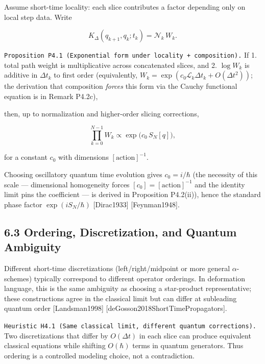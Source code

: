 \documentclass[
]{article}
\begin{document}
Assume short-time locality: each slice contributes a factor depending
only on local step data. Write

\[
K_\Delta(q_{k+1},q_k;t_k)=\mathcal N_k\,W_k.
\]

\texttt{Proposition\ P4.1\ (Exponential\ form\ under\ locality\ +\ composition).}
If 1. total path weight is multiplicative across concatenated slices,
and 2. \(\log W_k\) is additive in \(\Delta t_k\) to first order
(equivalently,
\(W_k = \exp(c_0 \mathcal{L}_k \Delta t_k + O(\Delta t^2))\); the
derivation that composition \emph{forces} this form via the Cauchy
functional equation is in Remark P4.2c),

then, up to normalization and higher-order slicing corrections,

\[
\prod_{k=0}^{N-1}W_k
\propto
\exp\!\big(c_0\,S_N[q]\big),
\]

for a constant \(c_0\) with dimensions \([\text{action}]^{-1}\).

Choosing oscillatory quantum time evolution gives \(c_0=i/\hbar\) (the
necessity of this scale --- dimensional homogeneity forces
\([c_0]=[\text{action}]^{-1}\) and the identity limit pins the
coefficient --- is derived in Proposition P4.2(ii)), hence the standard
phase factor \(\exp(iS_N/\hbar)\) {[}Dirac1933{]} {[}Feynman1948{]}.

\hypertarget{ordering-discretization-and-quantum-ambiguity}{%
\subsection{6.3 Ordering, Discretization, and Quantum
Ambiguity}\label{ordering-discretization-and-quantum-ambiguity}}

Different short-time discretizations (left/right/midpoint or more
general \(\alpha\)-schemes) typically correspond to different operator
orderings. In deformation language, this is the same ambiguity as
choosing a star-product representative; these constructions agree in the
classical limit but can differ at subleading quantum order
{[}Landsman1998{]} {[}deGosson2018ShortTimePropagators{]}.

\texttt{Heuristic\ H4.1\ (Same\ classical\ limit,\ different\ quantum\ corrections).}
Two discretizations that differ by \(O(\Delta t)\) in each slice can
produce equivalent classical equations while shifting \(O(\hbar)\) terms
in quantum generators. Thus ordering is a controlled modeling choice,
not a contradiction.
\end{document}
